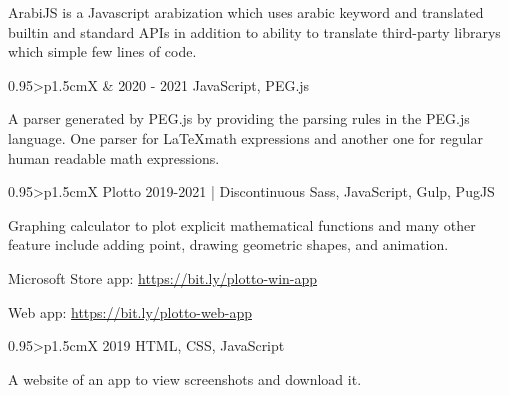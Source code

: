 \documentclass[a4paper, oneside, final]{scrartcl} %
\begin{document}
\begin{center}
\begin{paracol}{2}
\vspace{2mm}
\parbox{0.95\linewidth}{%
ArabiJS is a Javascript arabization which uses arabic keyword and translated builtin and standard APIs in addition to ability to translate third-party librarys which simple few lines of code.
}%

\vspace{20pt}

\begin{tabularx}{0.95\linewidth}{>{\raggedleft\scshape}p{1.5cm}X}
 { \& }
 {2020 - 2021}
 {JavaScript, PEG.js}
\end{tabularx}

\vspace{2mm}
\parbox{0.95\linewidth}{%
A parser generated by PEG.js by providing the parsing rules in the PEG.js language. One parser for \LaTeX math expressions and another one for regular human readable math expressions.
}%

\vspace{20pt}

\begin{tabularx}{0.95\linewidth}{>{\raggedleft\scshape}p{1.5cm}X}
 {Plotto}
 {2019-2021 \scriptsize{| Discontinuous}}
 {Sass, JavaScript, Gulp, PugJS}
\end{tabularx}

\vspace{2mm}
\parbox{0.95\linewidth}{%
Graphing calculator to plot explicit mathematical functions and many other feature include adding point, drawing geometric shapes, and animation.
}%
\begin{items}
\item Microsoft Store app: \url{https://bit.ly/plotto-win-app}
\item Web app: \url{https://bit.ly/plotto-web-app}
\end{items}

\vspace{20pt}

\begin{tabularx}{0.95\linewidth}{>{\raggedleft\scshape}p{1.5cm}X}
 {}
 {2019}
 {HTML, CSS, JavaScript}
\end{tabularx}

\vspace{2mm}
\parbox{0.95\linewidth}{
A website of an app to view screenshots and download it.
}


\end{paracol}


\end{center}
\end{document}
